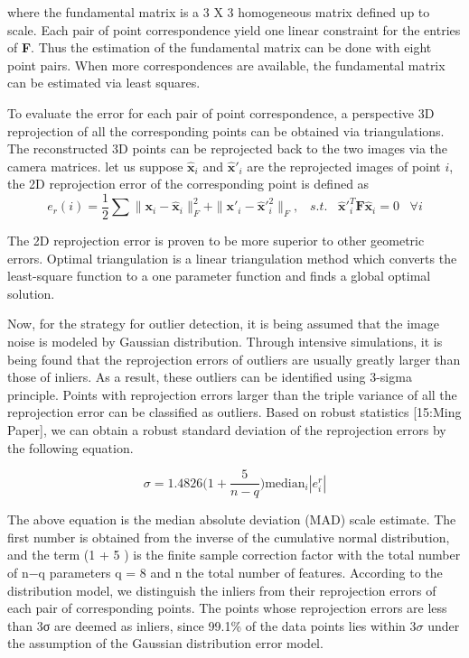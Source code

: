 where the fundamental matrix is a 3 X 3 homogeneous matrix defined up to scale. Each pair of point correspondence yield one linear constraint for the entries of \textbf{F}. Thus the estimation of the fundamental matrix can be done with eight point pairs. When more correspondences are available, the fundamental matrix can be estimated via least squares. 

To evaluate the error for each pair of point correspondence, a perspective 3D reprojection of all the corresponding points can be obtained via triangulations. The reconstructed 3D points can be reprojected back to the two images via the camera matrices. let us suppose $\mathbf{\hat{x}}_i$ and $\mathbf{\hat{x}}'_i$ are the reprojected images of point $i$, the 2D reprojection error of the corresponding point is defined as
\begin{equation}
e_{r}(i) = \frac{1}{2} \sum \|\mathbf{x}_i-\mathbf{\hat{x}}_i\|^2_F + \|\mathbf{x}'_i-\mathbf{\hat{x}}'^2_i\|_F, \;\;\;s.t.\;\;\; 
\mathbf{\hat{x}}'^T_i \mathbf{F} \mathbf{\hat{x}}_i=0 \;\;\; \forall i
\end{equation}


The 2D reprojection error is proven to be more superior to other geometric errors. Optimal triangulation is a linear triangulation method which converts the least-square function to a one parameter function and finds a global optimal solution.

Now, for the strategy for outlier detection, it is being assumed that the image noise is modeled by Gaussian distribution. Through intensive simulations, it is being found that the reprojection errors of outliers are usually greatly larger than those of inliers. As a result, these outliers can be identified using 3-sigma principle. Points with reprojection errors larger than the triple variance of all the reprojection error can be classified as outliers. Based on robust statistics [15:Ming Paper], we can obtain a robust standard deviation of the reprojection errors by the following equation.

\begin{equation}
\sigma = 1.4826 \Big(1+\frac{5}{n-q}\Big)\text{median}_i|e^r_i|
\end{equation}

The above equation is the median absolute deviation (MAD) scale estimate.
The first number is obtained from the inverse of the cumulative normal distribution,
and the term (1 + 5 ) is the finite sample correction factor with the total number of n−q
parameters q = 8 and n the total number of features. According to the distribution model, we distinguish the inliers from their reprojection errors of each pair of corresponding points. The points whose reprojection errors are less than 3σ are deemed as inliers, since 99.1{\%} of the data points lies within 3$\sigma$ under the assumption of the Gaussian distribution error model.

